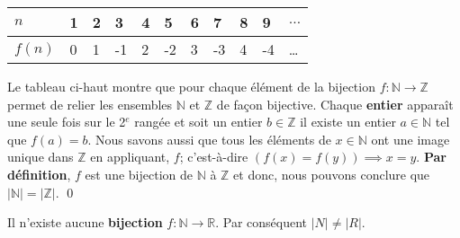 \documentclass[16pt]{report}
\begin{document}
\begin{multicols*}{2}
            \begin{table}[H]
              \begin{center}
                \renewcommand{\arraystretch}{1.5}
                \selectfont
                \footnotesize
                    \begin{tabular}{l|l l l l l l l l l l}
                    \arrayrulecolor{blue}\hline
                    \rowcolor{lightBlue}
                    \textcolor{myb}{$n$} & \textcolor{myb}{1} & \textcolor{myb}{ 2} & \textcolor{myb}{3} 
                                                         & \textcolor{myb}{4} 
                                       & \textcolor{myb}{5} & \textcolor{myb}{6} & \textcolor{myb}{7} 
                                       & \textcolor{myb}{8} & \textcolor{myb}{9} & \textcolor{myb}{$\dots$}
                    \\
                    \hline
                    \arrayrulecolor{black}
                    $f(n)$ & 0 & 1 & -1 & 2 & -2 & 3 & -3 & 4 & -4 & \dots
                    \\
                    \hline
                    \end{tabular}
            \end{center}
            \end{table}
                    

            \begin{Preuve}{}{}
                Le tableau ci-haut montre que pour chaque élément de la bijection 
                $ f : \mathbb{N} \rightarrow \mathbb{Z}$ permet de relier les ensembles 
                $\mathbb{N}$ et $\mathbb{Z}$ de façon bijective. Chaque \textbf{entier} apparaît une seule fois 
                sur le 2$^e$ rangée  et soit un entier $b \in \mathbb{Z}$ il existe un entier 
                $a \in \mathbb{N}$ tel que $f(a) = b$. Nous savons aussi que tous les éléments de 
                $x \in \mathbb{N}$ ont une image unique dans $\mathbb{Z}$ en appliquant, $f$; c'est-à-dire 
                $(f(x) = f(y)) \implies x = y$. \textbf{Par définition}, $f$ est une 
                bijection de $\mathbb{N}$ à $\mathbb{Z}$ et donc, nous pouvons conclure que 
                $|\mathbb{N}| = |\mathbb{Z}|$. \qed
            \end{Preuve}


            \begin{Theorem}{}{}
                 Il n'existe aucune \textbf{bijection} $f : \mathbb{N} \rightarrow  \mathbb{R}$. Par conséquent 
                $|N| \neq |R|$. 
               

\end{Theorem}
\end{multicols*}
\end{document}
